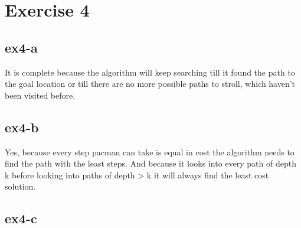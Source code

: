 \section{Exercise 4}
\subsection{ex4-a}
It is complete because the algorithm will keep searching till it found the path to the goal location or till there are no more
possible paths to stroll, which haven't been visited before.

\subsection{ex4-b}
Yes, because every step pacman can take is equal in cost the algorithm needs to find the path with the least steps.
And because it looks into every path of depth k before looking into paths of depth > k it will
always find the least cost solution.

\subsection{ex4-c}

